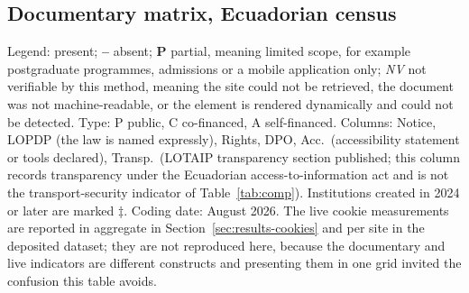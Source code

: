 \documentclass[pdflatex,sn-basic,Numbered,iicol]{sn-jnl}
\newcommand{\si}{\ding{51}}
\newcommand{\no}{\textcolor{gris}{\textbf{--}}}
\newcommand{\nv}{\textsl{\footnotesize NV}}
\theoremstyle{thmstyleone}
\theoremstyle{thmstyletwo}
\theoremstyle{thmstylethree}
\begin{document}
\begin{appendices}
\section{Documentary matrix, Ecuadorian census}\label{ap:ecuador}
\setcounter{table}{0}\setcounter{figure}{0}

Legend: \si{} present; \no{} absent; \textbf{P} partial, meaning limited scope, for example postgraduate programmes, admissions or a mobile application only; \nv{} not verifiable by this method, meaning the site could not be retrieved, the document was not machine-readable, or the element is rendered dynamically and could not be detected. Type: P public, C co-financed, A self-financed. Columns: Notice, LOPDP (the law is named expressly), Rights, DPO, Acc.\ (accessibility statement or tools declared), Transp.\ (LOTAIP transparency section published; this column records transparency under the Ecuadorian access-to-information act and is not the transport-security indicator of Table~\ref{tab:comp}). Institutions created in 2024 or later are marked $\ddagger$. Coding date: August 2026. The live cookie measurements are reported in aggregate in Section~\ref{sec:results-cookies} and per site in the deposited dataset; they are not reproduced here, because the documentary and live indicators are different constructs and presenting them in one grid invited the confusion this table avoids.


\end{appendices}
\end{document}
